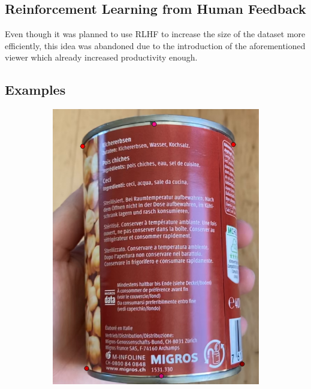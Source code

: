 \documentclass[a4paper,11pt]{report}
\begin{document}
            \subsection{Reinforcement Learning from Human Feedback}
                Even though it was planned to use RLHF to increase the size of the dataset more efficiently, this idea was abandoned due to the introduction of the aforementioned viewer which already increased productivity enough.
                
                
            \subsection{Examples}
                \begin{figure}[h]
                    \centering
                    \begin{subfigure}{0.45\textwidth}
                        \centering
                        \includegraphics[width=\textwidth]{full_image_example_1.png}

\end{subfigure}
\end{figure}
\end{document}
